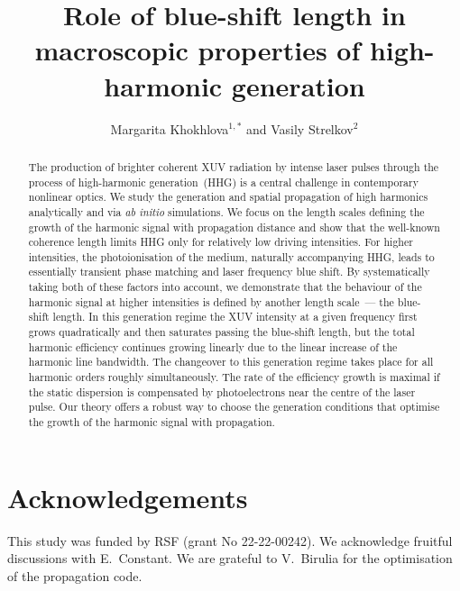 \documentclass[onecolumn,showpacs,amsmath,amssymb,aps,pra,floatfix,nofootinbib,10pt]{revtex4-2}
\begin{document}
\title{%
Role of blue-shift length in macroscopic properties of high-harmonic generation
}

\author{
Margarita Khokhlova$^{1,\ast}$ and Vasily Strelkov$^{2}$
}

\begin{abstract}%
The production of brighter coherent XUV radiation by intense laser pulses through the process of high-harmonic generation~(HHG) is a central challenge in contemporary nonlinear optics. We study the generation and spatial propagation of high harmonics analytically and via {\it ab initio} simulations. We focus on the length scales defining the growth of the harmonic signal with propagation distance and show that the well-known coherence length limits HHG only for relatively low driving intensities. For higher intensities, the photoionisation of the medium, naturally accompanying HHG, leads to essentially transient phase matching and laser frequency blue shift. By systematically taking both of these factors into account, we demonstrate that the behaviour of the harmonic signal at higher intensities is defined by another length scale~--- the blue-shift length. In this generation regime the XUV intensity at a given frequency first grows quadratically and then saturates passing the blue-shift length, but the total harmonic efficiency continues growing linearly due to the linear increase of the harmonic line bandwidth. The changeover to this generation regime takes place for all harmonic orders roughly simultaneously. The rate of the efficiency growth is maximal if the static dispersion is compensated by photoelectrons near the centre of the laser pulse. Our theory offers a robust way to choose the generation conditions that optimise the growth of the harmonic signal with propagation.
\end{abstract}

\maketitle
\noindent



\section*{Acknowledgements}
This study was funded by RSF (grant No 22-22-00242). 
We acknowledge fruitful discussions with E.~Constant. 
We are grateful to V.~Birulia for the optimisation of the propagation code. 


\end{document}
